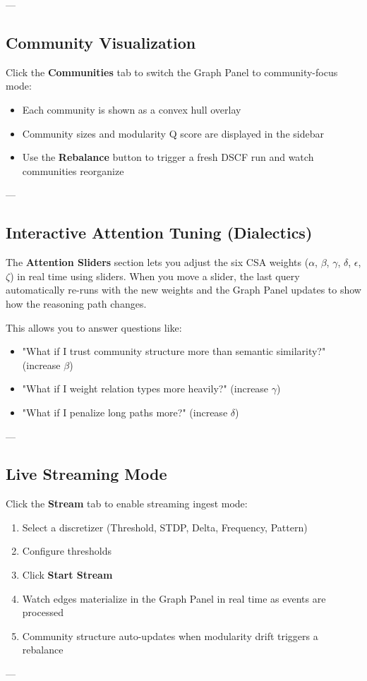 \documentclass[11pt,article,oneside]{memoir}
\begin{document}
---

\subsection{Community Visual\-ization}

Click the \textbf{Communities} tab to switch the Graph Panel to community-focus mode:
\begin{itemize}
\item Each community is shown as a convex hull overlay
\item Community sizes and modularity Q score are displayed in the sidebar
\item Use the \textbf{Rebalance} button to trigger a fresh DSCF run and watch communities reorganize

\end{itemize}
---

\subsection{Interactive Attention Tuning (Dialectics)}

The \textbf{Attention Sliders} section lets you adjust the six CSA weights ($\alpha$, $\beta$, $\gamma$, $\delta$, $\epsilon$, $\zeta$) in real time using sliders. When you move a slider, the last query autom\-atically re-runs with the new weights and the Graph Panel updates to show how the reasoning path changes.

This allows you to answer questions like:
\begin{itemize}
\item "What if I trust community structure more than semantic similarity?" (increase $\beta$)
\item "What if I weight relation types more heavily?" (increase $\gamma$)
\item "What if I penalize long paths more?" (increase $\delta$)

\end{itemize}
---

\subsection{Live Streaming Mode}

Click the \textbf{Stream} tab to enable streaming ingest mode:
\begin{enumerate}
\item Select a discretizer (Threshold, STDP, Delta, Frequency, Pattern)
\item Configure thresholds
\item Click \textbf{Start Stream}
\item Watch edges materialize in the Graph Panel in real time as events are processed
\item Community structure auto-updates when modularity drift triggers a rebalance

\end{enumerate}
---
\end{document}
